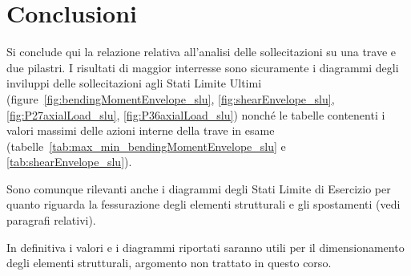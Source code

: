 \chapter{Conclusioni}
Si conclude qui la relazione relativa all'analisi delle sollecitazioni su una trave e due pilastri. I risultati di maggior interresse sono sicuramente i diagrammi degli inviluppi delle sollecitazioni agli Stati Limite Ultimi (figure~\ref{fig:bendingMomentEnvelope_slu}, \ref{fig:shearEnvelope_slu},  \ref{fig:P27axialLoad_slu}, \ref{fig:P36axialLoad_slu}) nonché le tabelle contenenti i valori massimi delle azioni interne della trave in esame (tabelle~\ref{tab:max_min_bendingMomentEnvelope_slu} e \ref{tab:shearEnvelope_slu}).

Sono comunque rilevanti anche i diagrammi degli Stati Limite di Esercizio per quanto riguarda la fessurazione degli elementi strutturali e gli spostamenti (vedi paragrafi relativi). 

In definitiva i valori e i diagrammi riportati saranno utili per il dimensionamento degli elementi strutturali, argomento non trattato in questo corso.
